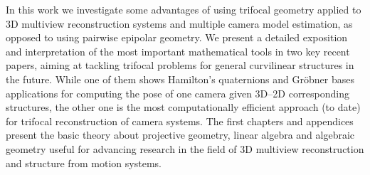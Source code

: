\documentclass[a4paper,12pt,oneside,onecolumn,final,fleqn]{repUERJ}
\begin{document}
In this work we investigate some advantages of using trifocal geometry applied to 3D multiview reconstruction systems and multiple camera model estimation, as opposed to using pairwise epipolar geometry. We present a detailed exposition and interpretation of the most important mathematical tools in two key recent papers, aiming at tackling trifocal problems for general curvilinear structures in the future. While one of them shows Hamilton's quaternions and Gr\"obner bases applications for computing the pose of one camera given 3D--2D corresponding structures, the other one is the most computationally efficient approach (to date) for trifocal reconstruction of camera systems. The first chapters and appendices present the basic theory about projective geometry, linear algebra and algebraic geometry useful for advancing research in the field of 3D multiview reconstruction and structure from motion systems.\\

\printkeys %
\sumario
\mainmatter

\end{document}
